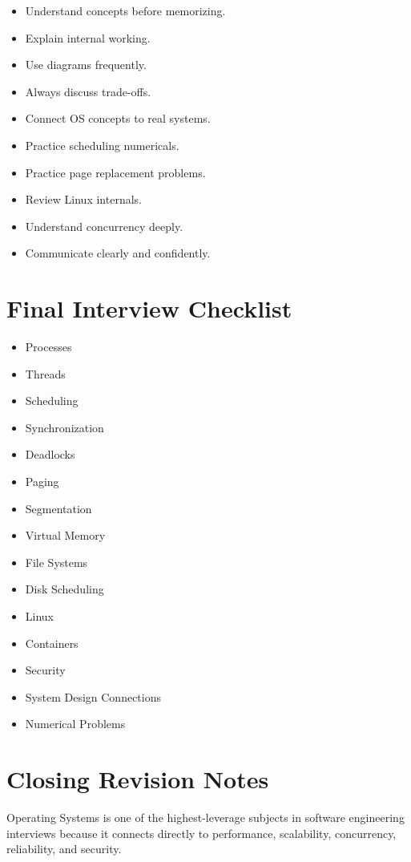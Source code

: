 \begin{itemize}
\item Understand concepts before memorizing.
\item Explain internal working.
\item Use diagrams frequently.
\item Always discuss trade-offs.
\item Connect OS concepts to real systems.
\item Practice scheduling numericals.
\item Practice page replacement problems.
\item Review Linux internals.
\item Understand concurrency deeply.
\item Communicate clearly and confidently.
\end{itemize}

\section{Final Interview Checklist}

\begin{itemize}
\item Processes
\item Threads
\item Scheduling
\item Synchronization
\item Deadlocks
\item Paging
\item Segmentation
\item Virtual Memory
\item File Systems
\item Disk Scheduling
\item Linux
\item Containers
\item Security
\item System Design Connections
\item Numerical Problems
\end{itemize}

\section{Closing Revision Notes}

Operating Systems is one of the highest-leverage subjects in software engineering interviews because it connects directly to performance, scalability, concurrency, reliability, and security.

